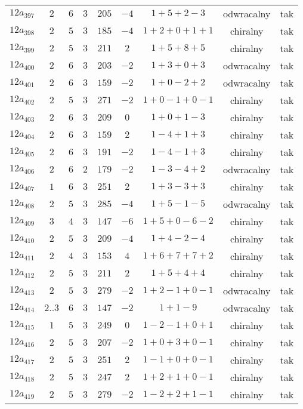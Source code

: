 \begin{longtable}{ccccccccc}
$12a_{397}$ & $2$ & $6$ & $3$ & $205$ & $-4$ & $1+5+2-3$ & odwracalny & tak \\
$12a_{398}$ & $2$ & $5$ & $3$ & $185$ & $-4$ & $1+2+0+1+1$ & chiralny & tak \\
$12a_{399}$ & $2$ & $5$ & $3$ & $211$ & $2$ & $1+5+8+5$ & chiralny & tak \\
$12a_{400}$ & $2$ & $6$ & $3$ & $203$ & $-2$ & $1+3+0+3$ & odwracalny & tak \\
$12a_{401}$ & $2$ & $6$ & $3$ & $159$ & $-2$ & $1+0-2+2$ & odwracalny & tak \\
$12a_{402}$ & $2$ & $5$ & $3$ & $271$ & $-2$ & $1+0-1+0-1$ & chiralny & tak \\
$12a_{403}$ & $2$ & $6$ & $3$ & $209$ & $0$ & $1+0+1-3$ & chiralny & tak \\
$12a_{404}$ & $2$ & $6$ & $3$ & $159$ & $2$ & $1-4+1+3$ & chiralny & tak \\
$12a_{405}$ & $2$ & $6$ & $3$ & $191$ & $-2$ & $1-4-1+3$ & chiralny & tak \\
$12a_{406}$ & $2$ & $6$ & $2$ & $179$ & $-2$ & $1-3-4+2$ & odwracalny & tak \\
$12a_{407}$ & $1$ & $6$ & $3$ & $251$ & $2$ & $1+3-3+3$ & chiralny & tak \\
$12a_{408}$ & $2$ & $5$ & $3$ & $285$ & $-4$ & $1+5-1-5$ & odwracalny & tak \\
$12a_{409}$ & $3$ & $4$ & $3$ & $147$ & $-6$ & $1+5+0-6-2$ & chiralny & tak \\
$12a_{410}$ & $2$ & $5$ & $3$ & $209$ & $-4$ & $1+4-2-4$ & chiralny & tak \\
$12a_{411}$ & $2$ & $4$ & $3$ & $153$ & $4$ & $1+6+7+7+2$ & chiralny & tak \\
$12a_{412}$ & $2$ & $5$ & $3$ & $211$ & $2$ & $1+5+4+4$ & chiralny & tak \\
$12a_{413}$ & $2$ & $5$ & $3$ & $279$ & $-2$ & $1+2-1+0-1$ & odwracalny & tak \\
$12a_{414}$ & $2..3$ & $6$ & $3$ & $147$ & $-2$ & $1+1-9$ & odwracalny & tak \\
$12a_{415}$ & $1$ & $5$ & $3$ & $249$ & $0$ & $1-2-1+0+1$ & chiralny & tak \\
$12a_{416}$ & $2$ & $5$ & $3$ & $207$ & $-2$ & $1+0+3+0-1$ & chiralny & tak \\
$12a_{417}$ & $2$ & $5$ & $3$ & $251$ & $2$ & $1-1+0+0-1$ & chiralny & tak \\
$12a_{418}$ & $2$ & $5$ & $3$ & $247$ & $2$ & $1+2+1+0-1$ & chiralny & tak \\
$12a_{419}$ & $2$ & $5$ & $3$ & $279$ & $-2$ & $1-2+2+1-1$ & chiralny & tak \\

\end{longtable}
